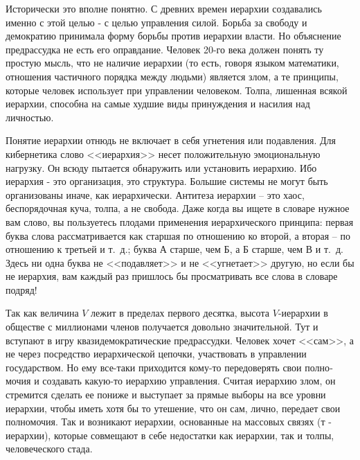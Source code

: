 \documentclass{book}
\begin{document}
Исторически это вполне понятно. С древних времен иерар­хии создавались именно с этой целью - с целью управления си­лой. Борьба за свободу и демократию принимала форму борьбы против иерархии власти. Но объяснение предрассудка не есть его оправдание. Человек 20-го века должен понять ту простую мысль, что не наличие иерархии (то есть, говоря языком математики, отношения частичного порядка между людьми) является злом, а те принципы, которые человек использует при управлении че­ловеком. Толпа, лишенная всякой иерархии, способна на самые худшие виды принуждения и насилия над личностью.

Понятие иерархии отнюдь не включает в себя угнетения или по­давления. Для кибернетика слово <<иерархия>> несет положитель­ную эмоциональную нагрузку. Он всюду пытается обнаружить или установить иерархию. Ибо иерархия - это организация, это структура. Большие системы не могут быть организованы иначе, как иерархически. Антитеза иерархии -- это хаос, беспорядочная куча, толпа, а не свобода. Даже когда вы ищете в словаре нужное вам слово, вы пользуетесь плодами применения иерархического принципа: первая буква слова рассматривается как старшая по отношению ко второй, а вторая -- по отношению к третьей и т.~д.; буква А старше, чем Б, а Б старше, чем В и т.~д. Здесь ни одна буква не <<подавляет>> и не <<угнетает>> другую, но если бы не ие­рархия, вам каждый раз пришлось бы просматривать все слова в словаре подряд!

Так как величина $V$  лежит в пределах первого десятка, высо­та $V$-иерархии в обществе с миллионами членов получается до­вольно значительной. Тут и вступают в игру квазидемократические предрассудки. Человек хочет <<сам>>, а не через посредство иерархической цепочки, участвовать в управлении государством. Но ему все-таки приходится кому-то передоверять свои полно­мочия и создавать какую-то иерархию управления. Считая иерар­хию злом, он стремится сделать ее пониже и выступает за пря­мые выборы на все уровни иерархии, чтобы иметь хотя бы то утешение, что он сам, лично,  передает свои полномочия. Так и возникают иерархии, основанные на массовых связях (т -  иерархии), которые совмещают в себе недостатки как иерархии, так и толпы, человеческого стада.
\end{document}
